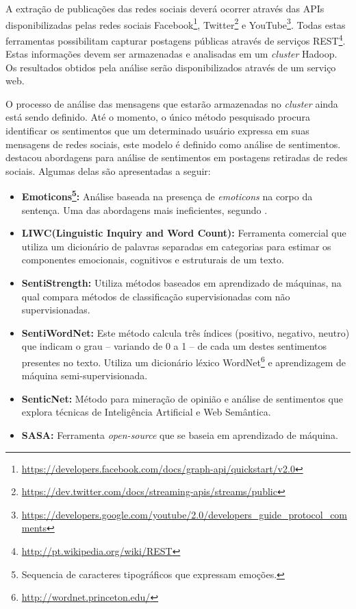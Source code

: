 A extração de publicações das redes sociais deverá ocorrer através das APIs disponibilizadas pelas redes sociais Facebook\footnote{\url{https://developers.facebook.com/docs/graph-api/quickstart/v2.0}}, Twitter\footnote{\url{https://dev.twitter.com/docs/streaming-apis/streams/public}} e YouTube\footnote{\url{https://developers.google.com/youtube/2.0/developers_guide_protocol_comments}}. Todas estas ferramentas possibilitam capturar postagens públicas através de serviços REST\footnote{\url{http://pt.wikipedia.org/wiki/REST}}. Estas informações devem ser armazenadas e analisadas em um \textit{cluster} Hadoop. Os resultados obtidos pela análise serão disponibilizados através de um serviço web.

O processo de análise das mensagens que estarão armazenadas no \textit{cluster} ainda está sendo definido. Até o momento, o único método pesquisado procura identificar os sentimentos que um determinado usuário expressa em suas mensagens de redes sociais, este modelo é definido como análise de sentimentos.  destacou abordagens para análise de sentimentos em postagens retiradas de redes sociais. Algumas delas são apresentadas a seguir:

\begin{itemize}

  \item \textbf{Emoticons\footnote{Sequencia de caracteres tipográficos que expressam emoções.}:} Análise baseada na presença de \textit{emoticons} na corpo da sentença. Uma das abordagens mais ineficientes, segundo .
  \item \textbf{LIWC(Linguistic Inquiry and Word Count):} Ferramenta comercial que utiliza um dicionário de palavras separadas em categorias para estimar os componentes emocionais, cognitivos e estruturais de um texto.
  \item \textbf{SentiStrength:} Utiliza métodos baseados em aprendizado de máquinas, na qual compara métodos de classificação supervisionadas com não supervisionadas.
  \item \textbf{SentiWordNet:} Este método calcula três índices (positivo, negativo, neutro) que indicam o grau – variando de 0 a 1 – de cada um destes sentimentos presentes no texto. Utiliza um dicionário léxico WordNet\footnote{\url{http://wordnet.princeton.edu/}} e aprendizagem de máquina semi-supervisionada.
  \item \textbf{SenticNet:} Método para mineração de opinião e análise de sentimentos que explora técnicas de Inteligência Artificial e Web Semântica.
  \item \textbf{SASA:} Ferramenta \textit{open-source} que se baseia em aprendizado de máquina.

\end{itemize}


















